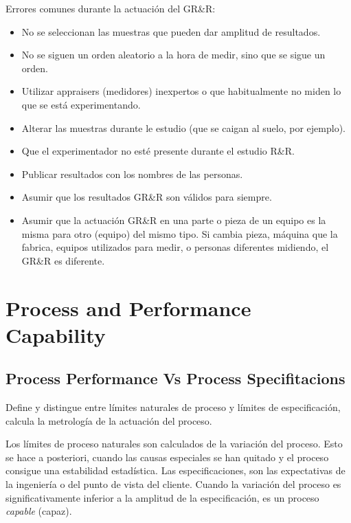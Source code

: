 \documentclass[oneside]{book}
\begin{document}
Errores comunes durante la actuación del GR\&R:
\begin{itemize}
	\item No se seleccionan las muestras que pueden dar amplitud de resultados.
	\item No se siguen un orden aleatorio a la hora de medir, sino que se sigue un orden.
	\item Utilizar appraisers (medidores) inexpertos o que habitualmente no miden lo que se está experimentando.
	\item Alterar las muestras durante le estudio (que se caigan al suelo, por ejemplo).
	\item Que el experimentador no esté presente durante el estudio R\&R.
	\item Publicar resultados con los nombres de las personas.
	\item Asumir que los resultados GR\&R son válidos para siempre.
	\item Asumir que la actuación GR\&R en una parte o pieza de un equipo es la misma para otro (equipo) del mismo tipo. Si cambia pieza, máquina que la fabrica, equipos utilizados para medir, o personas diferentes midiendo, el GR\&R es diferente.
\end{itemize}


\pagebreak
\chapter{Process and Performance Capability}

\section{Process Performance Vs Process Specifitacions}

Define y distingue entre límites naturales de proceso y límites de especificación, calcula la metrología de la actuación del proceso.

Los límites de proceso naturales son calculados de la variación del proceso. Esto se hace a posteriori, cuando las causas especiales se han quitado y el proceso consigue una estabilidad estadística. Las especificaciones, son las expectativas de la ingeniería o del punto de vista del cliente. Cuando la variación del proceso es significativamente inferior a la amplitud de la especificación, es un proceso \textit{capable} (capaz).
\end{document}
